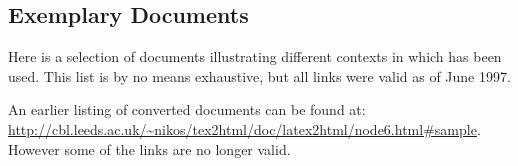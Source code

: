\subsection{Exemplary Documents\label{exemplary}}
Here is a selection of documents illustrating different contexts in 
which \latextohtml{} has been used. This list is by no means exhaustive,
but all links were valid as of June 1997.

\medskip\noindent
An earlier listing of converted documents can be found at:
\url{http://cbl.leeds.ac.uk/~nikos/tex2html/doc/latex2html/node6.html#sample}.
However some of the links are no longer valid.

